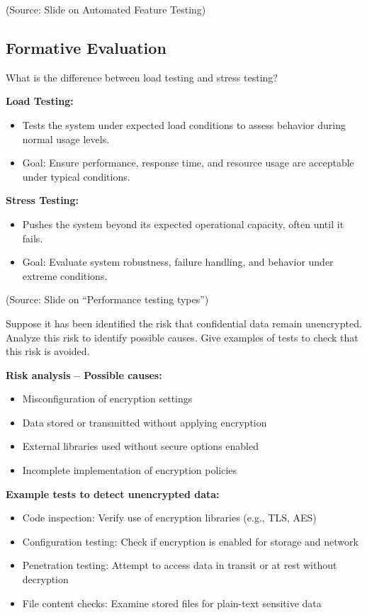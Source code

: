 \documentclass[12pt]{article}
\begin{document}
(Source: Slide on Automated Feature Testing)

\subsection{Formative Evaluation}

\begin{questionbox}
What is the difference between load testing and stress testing?
\end{questionbox}

\textbf{Load Testing:}
\begin{itemize}
    \item Tests the system under expected load conditions to assess behavior during normal usage levels.
    \item Goal: Ensure performance, response time, and resource usage are acceptable under typical conditions.
\end{itemize}

\textbf{Stress Testing:}
\begin{itemize}
    \item Pushes the system beyond its expected operational capacity, often until it fails.
    \item Goal: Evaluate system robustness, failure handling, and behavior under extreme conditions.
\end{itemize}

(Source: Slide on ``Performance testing types'')

\begin{questionbox}
Suppose it has been identified the risk that confidential data remain unencrypted. Analyze this risk to identify possible causes. Give examples of tests to check that this risk is avoided.
\end{questionbox}

\textbf{Risk analysis -- Possible causes:}
\begin{itemize}
    \item Misconfiguration of encryption settings
    \item Data stored or transmitted without applying encryption
    \item External libraries used without secure options enabled
    \item Incomplete implementation of encryption policies
\end{itemize}

\textbf{Example tests to detect unencrypted data:}
\begin{itemize}
    \item Code inspection: Verify use of encryption libraries (e.g., TLS, AES)
    \item Configuration testing: Check if encryption is enabled for storage and network
    \item Penetration testing: Attempt to access data in transit or at rest without decryption
    \item File content checks: Examine stored files for plain-text sensitive data
\end{itemize}
\end{document}

